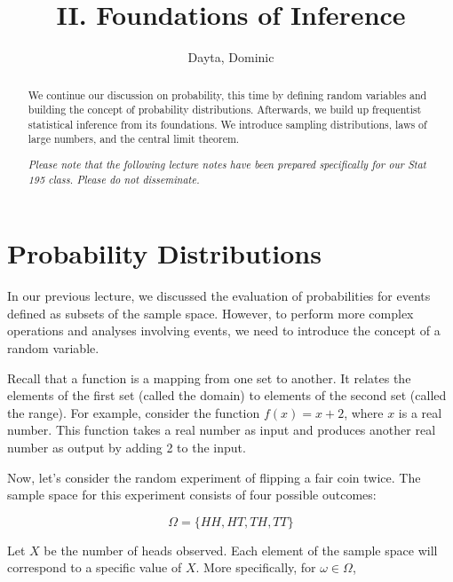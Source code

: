 \documentclass{article}
\title{II. Foundations of Inference}
\author{Dayta, Dominic}
\begin{document}
\begin{titlepage}
\thispagestyle{empty}
\maketitle

\begin{abstract}
We continue our discussion on probability, this time by defining random variables and building the concept of probability distributions. Afterwards, we build up frequentist statistical inference from its foundations. We introduce sampling distributions, laws of large numbers, and the central limit theorem. 

\textit{Please note that the following lecture notes have been prepared specifically for our Stat 195 class. Please do not disseminate.}
\end{abstract}

\tableofcontents
\end{titlepage}



\section{Probability Distributions}

In our previous lecture, we discussed the evaluation of probabilities for events defined as subsets of the sample space. However, to perform more complex operations and analyses involving events, we need to introduce the concept of a random variable.

Recall that a function is a mapping from one set to another. It relates the elements of the first set (called the domain) to elements of the second set (called the range). For example, consider the function $f(x) = x + 2$, where $x$ is a real number. This function takes a real number as input and produces another real number as output by adding 2 to the input.

Now, let's consider the random experiment of flipping a fair coin twice. The sample space for this experiment consists of four possible outcomes:

$$
\Omega = \{ HH, HT, TH, TT \}
$$

Let $X$ be the number of heads observed. Each element of the sample space will correspond to a specific value of $X$. More specifically, for $\omega \in \Omega$,
\end{document}
